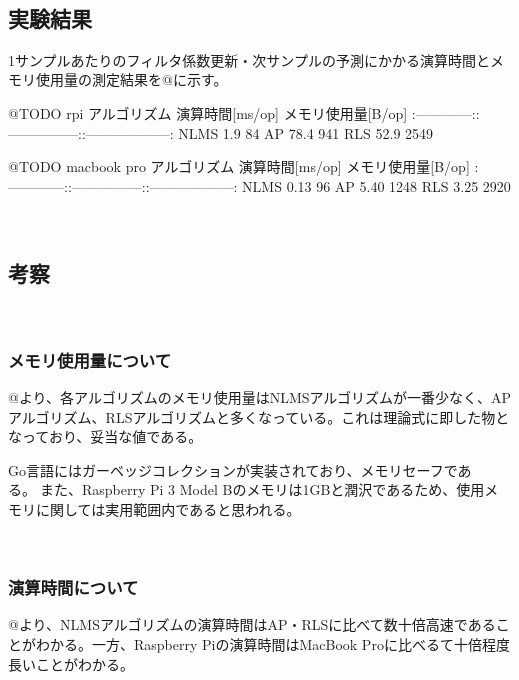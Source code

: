 \
\subsection{実験結果}\label{result-benchmark}

1サンプルあたりのフィルタ係数更新・次サンプルの予測にかかる演算時間とメモリ使用量の測定結果を@に示す。

@TODO rpi \textbar{} アルゴリズム \textbar{} 演算時間{[}ms/op{]}
\textbar{} メモリ使用量{[}B/op{]} \textbar{}
\textbar:------------:\textbar:---------------:\textbar:------------------:\textbar{}
\textbar{} NLMS \textbar{} 1.9 \textbar{} 84 \textbar{} \textbar{} AP
\textbar{} 78.4 \textbar{} 941 \textbar{} \textbar{} RLS \textbar{} 52.9
\textbar{} 2549 \textbar{}

@TODO macbook pro \textbar{} アルゴリズム \textbar{} 演算時間{[}ms/op{]}
\textbar{} メモリ使用量{[}B/op{]} \textbar{}
\textbar:------------:\textbar:---------------:\textbar:------------------:\textbar{}
\textbar{} NLMS \textbar{} 0.13 \textbar{} 96 \textbar{} \textbar{} AP
\textbar{} 5.40 \textbar{} 1248 \textbar{} \textbar{} RLS \textbar{}
3.25 \textbar{} 2920 \textbar{}

\
\subsection{考察}\label{consideration-color}

\
\subsubsection{メモリ使用量について}\label{about-memory}

@より、各アルゴリズムのメモリ使用量はNLMSアルゴリズムが一番少なく、APアルゴリズム、RLSアルゴリズムと多くなっている。これは理論式に即した物となっており、妥当な値である。

Go言語にはガーベッジコレクションが実装されており、メモリセーフである。また、Raspberry
Pi 3 Model
Bのメモリは1GBと潤沢であるため、使用メモリに関しては実用範囲内であると思われる。

\
\subsubsection{演算時間について}\label{about-time}

@より、NLMSアルゴリズムの演算時間はAP・RLSに比べて数十倍高速であることがわかる。一方、Raspberry
Piの演算時間はMacBook Proに比べるて十倍程度長いことがわかる。

